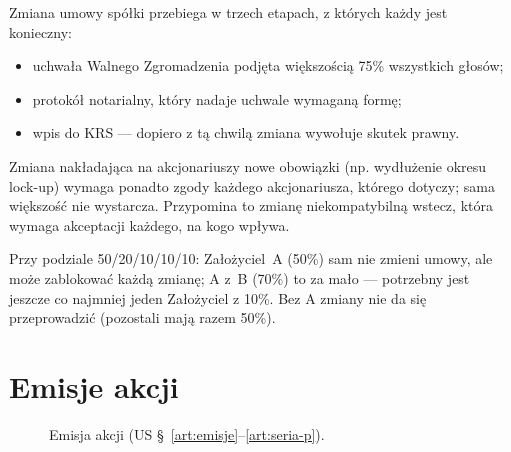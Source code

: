 \documentclass[11pt,a4paper]{report}
\begin{document}
\begin{OCoChodzi}
Zmiana umowy spółki przebiega w trzech etapach, z których każdy jest konieczny:
\begin{itemize}
  \item uchwała Walnego Zgromadzenia podjęta większością 75\% wszystkich głosów;
  \item protokół notarialny, który nadaje uchwale wymaganą formę;
  \item wpis do KRS --- dopiero z tą chwilą zmiana wywołuje skutek prawny.
\end{itemize}
Zmiana nakładająca na akcjonariuszy nowe obowiązki (np. wydłużenie okresu lock-up) wymaga ponadto zgody każdego akcjonariusza, którego dotyczy; sama większość nie wystarcza. Przypomina to zmianę niekompatybilną wstecz, która wymaga akceptacji każdego, na kogo wpływa.
\end{OCoChodzi}

\begin{Komentarz}
Przy podziale 50/20/10/10/10: Założyciel~A (50\%) sam nie zmieni umowy, ale może zablokować każdą zmianę; A z~B (70\%) to za mało --- potrzebny jest jeszcze co najmniej jeden Założyciel z 10\%. Bez A zmiany nie da się przeprowadzić (pozostali mają razem 50\%).
\end{Komentarz}

\section{Emisje akcji}

\begin{figure}[H]
\centering
{}
\caption{Emisja akcji (US §~\ref{art:emisje}--\ref{art:seria-p}).}
\end{figure}
\end{document}
